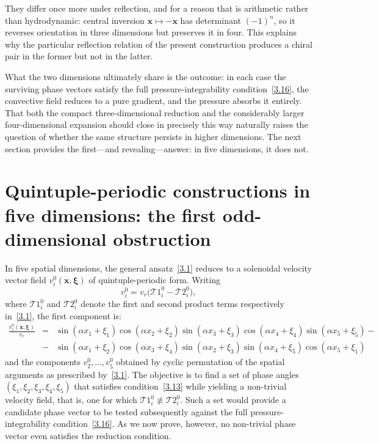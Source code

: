 \documentclass[11pt]{jfm}
\numberwithin{equation}{section}
\begin{document}
They differ once more under reflection, and for a reason that is arithmetic rather than
hydrodynamic: central inversion $\boldsymbol{x}\mapsto-\boldsymbol{x}$ has determinant $(-1)^n$, so
it reverses orientation in three dimensions but preserves it in four. This explains why the
particular reflection relation of the present construction produces a chiral pair in the former but
not in the latter.

What the two dimensions ultimately share is the outcome: in each case the surviving phase vectors
satisfy the full pressure-integrability condition~\eqref{3.16}, the convective field reduces to a
pure gradient, and the pressure absorbs it entirely. That both the compact three-dimensional
reduction and the considerably larger four-dimensional expansion should close in precisely this way
naturally raises the question of whether the same structure persists in higher dimensions. The next
section provides the first---and revealing---answer: in five dimensions, it does not.
\section{Quintuple-periodic constructions in five dimensions: the first odd-dimensional
obstruction}
\label{sec:5D}
In five spatial dimensions, the general ansatz~\eqref{3.1} reduces to a solenoidal velocity
vector field $v_i^0(\boldsymbol{x}, \boldsymbol{\xi})$ of quintuple-periodic form. Writing
\[
v_i^0 = v_r\bigl(\mathcal{T}1_i^0 - \mathcal{T}2_i^0\bigr),
\]
where $\mathcal{T}1_i^0$ and $\mathcal{T}2_i^0$ denote the first and second product terms
respectively in~\eqref{3.1}, the first component is:
\begin{eqnarray}
\label{5.1}
\frac{v_1^0(\boldsymbol{x}, \boldsymbol{\xi})}{v_r}&=&
\sin { \left(\alpha x_1+\xi_1 \right) } \cos {\left(\alpha x_2+\xi_2\right) }
\sin { \left(\alpha x_3+\xi_3\right) } \cos { \left(\alpha x_4+\xi_4 \right) }
\sin {\left(\alpha x_5+\xi_5\right) }- \nonumber\\
&-&\sin  {\left( \alpha x_1+\xi_2\right) } \cos  { \left(\alpha x_3+\xi_4 \right) }
\sin  {\left( \alpha x_2+\xi_3\right) }\sin  {\left( \alpha x_4+\xi_5\right) }
\cos  { \left(\alpha x_5+\xi_1 \right) }
\end{eqnarray}
and the components $v_2^0,\dots,v_5^0$ obtained by cyclic permutation of the spatial arguments as prescribed by~\eqref{3.1}.
The objective is to find a set of phase angles $(\xi_1, \xi_2, \xi_3, \xi_4, \xi_5)$ that satisfies condition~\eqref{3.13} while yielding a non-trivial velocity field, that is, one for which $\mathcal{T}1_i^0 \not\equiv \mathcal{T}2_i^0$. Such a set would provide a candidate phase vector to be tested subsequently against the full pressure-integrability condition~\eqref{3.16}. As we now prove, however, no non-trivial phase vector even satisfies the reduction condition.
\end{document}
